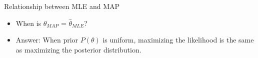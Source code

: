 \documentclass{beamer}
\begin{document}
\begin{frame}{Relationship between MLE and MAP}
\begin{itemize}
    \item When is $\hat{\theta}_{MAP}$ = $\hat{\theta}_{MLE}$?
    \item Answer: When prior $P(\theta)$ is uniform, maximizing the likelihood is the same as maximizing the posterior distribution.
\end{itemize} 
\end{frame}



\end{document}
